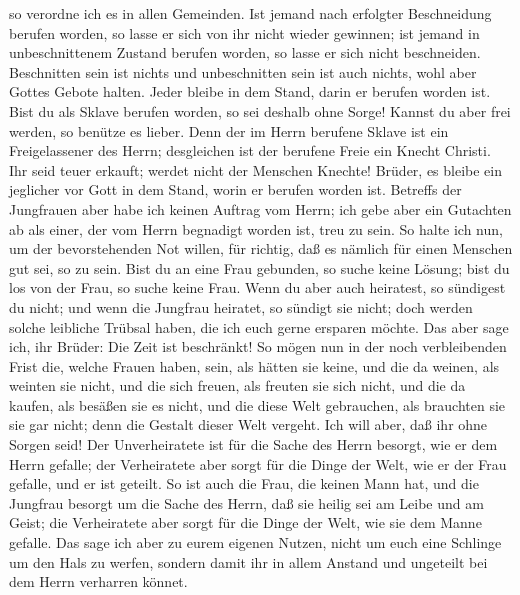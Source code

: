 so verordne ich es in allen Gemeinden.  Ist jemand nach
erfolgter Beschneidung berufen worden, so lasse er sich von ihr nicht
wieder gewinnen; ist jemand in unbeschnittenem Zustand berufen worden,
so lasse er sich nicht beschneiden.  Beschnitten sein ist
nichts und unbeschnitten sein ist auch nichts, wohl aber Gottes Gebote
halten.  Jeder bleibe in dem Stand, darin er berufen
worden ist.  Bist du als Sklave berufen worden, so sei
deshalb ohne Sorge! Kannst du aber frei werden, so benütze es lieber.
 Denn der im Herrn berufene Sklave ist ein Freigelassener
des Herrn; desgleichen ist der berufene Freie ein Knecht Christi.
 Ihr seid teuer erkauft; werdet nicht der Menschen
Knechte!  Brüder, es bleibe ein jeglicher vor Gott in dem
Stand, worin er berufen worden ist.  Betreffs der
Jungfrauen aber habe ich keinen Auftrag vom Herrn; ich gebe aber ein
Gutachten ab als einer, der vom Herrn begnadigt worden ist, treu zu
sein.  So halte ich nun, um der bevorstehenden Not
willen, für richtig, daß es nämlich für einen Menschen gut sei, so zu
sein.  Bist du an eine Frau gebunden, so suche keine
Lösung; bist du los von der Frau, so suche keine Frau. 
Wenn du aber auch heiratest, so sündigest du nicht; und wenn die
Jungfrau heiratet, so sündigt sie nicht; doch werden solche leibliche
Trübsal haben, die ich euch gerne ersparen möchte.  Das
aber sage ich, ihr Brüder: Die Zeit ist beschränkt! So mögen nun in der
noch verbleibenden Frist die, welche Frauen haben, sein, als hätten sie
keine,  und die da weinen, als weinten sie nicht, und die
sich freuen, als freuten sie sich nicht, und die da kaufen, als besäßen
sie es nicht,  und die diese Welt gebrauchen, als
brauchten sie sie gar nicht; denn die Gestalt dieser Welt vergeht.
 Ich will aber, daß ihr ohne Sorgen seid! Der
Unverheiratete ist für die Sache des Herrn besorgt, wie er dem Herrn
gefalle;  der Verheiratete aber sorgt für die Dinge der
Welt, wie er der Frau gefalle, und er ist geteilt.  So
ist auch die Frau, die keinen Mann hat, und die Jungfrau besorgt um die
Sache des Herrn, daß sie heilig sei am Leibe und am Geist; die
Verheiratete aber sorgt für die Dinge der Welt, wie sie dem Manne
gefalle.  Das sage ich aber zu eurem eigenen Nutzen,
nicht um euch eine Schlinge um den Hals zu werfen, sondern damit ihr in
allem Anstand und ungeteilt bei dem Herrn verharren könnet.
